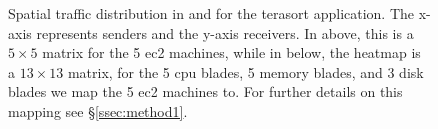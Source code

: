 \begin{figure}[t]
  \centering
  \caption{\small{Spatial traffic distribution in \pdis and \dis for the terasort application. The x-axis represents senders and the y-axis receivers. In \pdis above, this is a $5 \times 5$ matrix for the 5 ec2 machines, while in \dis below, the heatmap is a $13 \times 13$ matrix, for the 5 cpu blades, 5 memory blades, and 3 disk blades we map the 5 ec2 machines to. For further details on this mapping see \S\ref{ssec:method1}.}}
  
  \label{fig:sd}
\end{figure}
%

